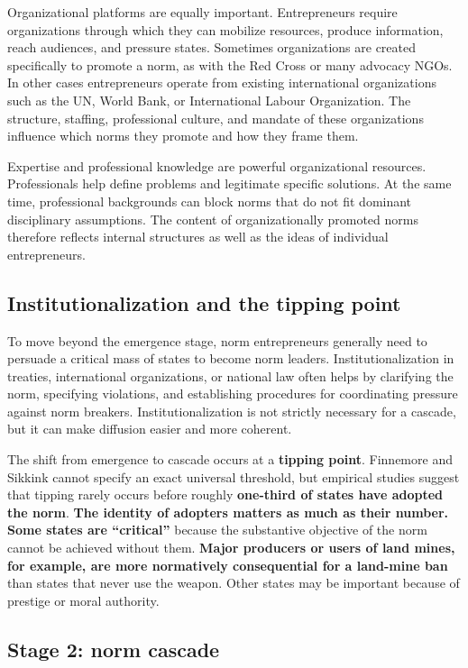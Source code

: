 Organizational platforms are equally important. Entrepreneurs require organizations through which they can mobilize resources, produce information, reach audiences, and pressure states. Sometimes organizations are created specifically to promote a norm, as with the Red Cross or many advocacy NGOs. In other cases entrepreneurs operate from existing international organizations such as the UN, World Bank, or International Labour Organization. The structure, staffing, professional culture, and mandate of these organizations influence which norms they promote and how they frame them.

Expertise and professional knowledge are powerful organizational resources. Professionals help define problems and legitimate specific solutions. At the same time, professional backgrounds can block norms that do not fit dominant disciplinary assumptions. The content of organizationally promoted norms therefore reflects internal structures as well as the ideas of individual entrepreneurs.

\subsection{Institutionalization and the tipping point}

To move beyond the emergence stage, norm entrepreneurs generally need to persuade a critical mass of states to become norm leaders. Institutionalization in treaties, international organizations, or national law often helps by clarifying the norm, specifying violations, and establishing procedures for coordinating pressure against norm breakers. Institutionalization is not strictly necessary for a cascade, but it can make diffusion easier and more coherent.

The shift from emergence to cascade occurs at a \textbf{tipping point}. Finnemore and Sikkink cannot specify an exact universal threshold, but empirical studies suggest that tipping rarely occurs before roughly \textbf{one-third of states have adopted the norm}. \textbf{The identity of adopters matters as much as their number. Some states are ``critical''} because the substantive objective of the norm cannot be achieved without them. \textbf{Major producers or users of land mines, for example, are more normatively consequential for a land-mine ban} than states that never use the weapon. Other states may be important because of prestige or moral authority.

\subsection{Stage 2: norm cascade}

